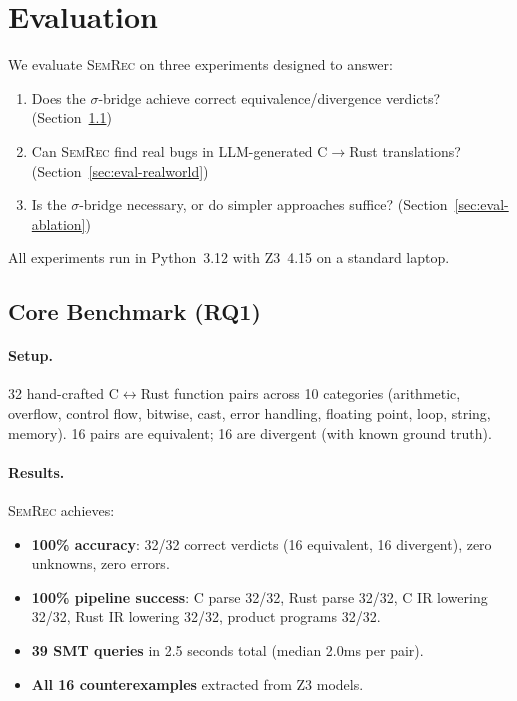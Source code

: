 \documentclass[11pt,a4paper]{article}
\begin{document}
\section{Evaluation}\label{sec:eval}

We evaluate \textsc{SemRec} on three experiments designed to answer:
\begin{enumerate}
  \item[\textbf{RQ1}] Does the $\sigma$-bridge achieve correct
    equivalence/divergence verdicts? (Section~\ref{sec:eval-core})
  \item[\textbf{RQ2}] Can \textsc{SemRec} find real bugs in LLM-generated
    C$\to$Rust translations? (Section~\ref{sec:eval-realworld})
  \item[\textbf{RQ3}] Is the $\sigma$-bridge necessary, or do simpler
    approaches suffice? (Section~\ref{sec:eval-ablation})
\end{enumerate}

All experiments run in Python~3.12 with Z3~4.15 on a standard laptop.

\subsection{Core Benchmark (RQ1)}\label{sec:eval-core}

\paragraph{Setup.} 32 hand-crafted C$\leftrightarrow$Rust function pairs
across 10 categories (arithmetic, overflow, control flow, bitwise, cast,
error handling, floating point, loop, string, memory).  16 pairs are
equivalent; 16 are divergent (with known ground truth).

\paragraph{Results.} \textsc{SemRec} achieves:
\begin{itemize}
  \item \textbf{100\% accuracy}: 32/32 correct verdicts (16 equivalent,
    16 divergent), zero unknowns, zero errors.
  \item \textbf{100\% pipeline success}: C parse 32/32, Rust parse 32/32,
    C IR lowering 32/32, Rust IR lowering 32/32, product programs 32/32.
  \item \textbf{39 SMT queries} in 2.5 seconds total (median 2.0ms per pair).
  \item \textbf{All 16 counterexamples} extracted from Z3 models.
\end{itemize}
\end{document}
